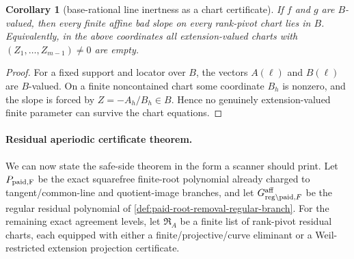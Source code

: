 \documentclass[11pt]{article}
\newtheorem{corollary}[theorem]{Corollary}
\theoremstyle{definition}
\theoremstyle{remark}
\newcommand{\B}{B}
\begin{document}
\begin{corollary}[base-rational line inertness as a chart certificate]
\label{cor:base-rational-line-inertness-chart}
If $f$ and $g$ are $\B$-valued, then every finite affine bad slope on every
rank-pivot chart lies in $\B$.  Equivalently, in the above coordinates all
extension-valued charts with $(Z_1,\ldots,Z_{m-1})\ne0$ are empty.
\end{corollary}

\begin{proof}
For a fixed support and locator over $\B$, the vectors $A(\ell)$ and $B(\ell)$
are $\B$-valued.  On a finite noncontained chart some coordinate $B_h$ is
nonzero, and the slope is forced by
$Z=-A_h/B_h\in\B$.  Hence no genuinely extension-valued finite parameter can
survive the chart equations.
\end{proof}

\paragraph{Residual aperiodic certificate theorem.}
We can now state the safe-side theorem in the form a scanner should print.  Let
$P_{\rm paid,F}$ be the exact squarefree finite-root polynomial already charged
to tangent/common-line and quotient-image branches, and let
$G_{{\rm reg}\setminus{\rm paid},F}^{\rm aff}$ be the regular residual polynomial
of \cref{def:paid-root-removal-regular-branch}.  For the remaining exact
agreement levels, let $\mathfrak R_A$ be a finite list of rank-pivot residual
charts, each equipped with either a finite/projective/curve eliminant or a
Weil-restricted extension projection certificate.
\end{document}
